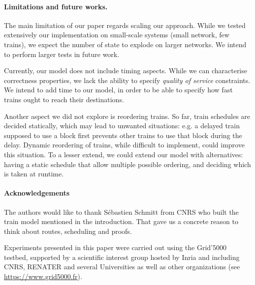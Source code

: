 \documentclass[runningheads]{llncs}
\begin{document}
\paragraph{Limitations and future works.}
The main limitation of our paper regards scaling our approach. While we tested extensively our implementation on small-scale systems (small network, few trains), we expect the number of state to explode on larger networks. We intend to perform larger tests in future work.

Currently, our model does not include timing aspects. While we can characterise correctness properties, we lack the ability to specify \emph{quality of service} constraints. We intend to add time to our model, in order to be able to specify how fast trains ought to reach their destinations.

Another aspect we did not explore is reordering trains. So far, train schedules are decided statically, which may lead to unwanted situations: e.g. a delayed train supposed to use a block first prevents other trains to use that block during the delay. Dynamic reordering of trains, while difficult to implement, could improve this situation. To a lesser extend, we could extend our model with alternatives: having a static schedule that allow multiple possible ordering, and deciding which is taken at runtime.


\paragraph{Acknowledgements} The authors would like to thank Sébastien Schmitt from CNRS who built the train model mentioned in the introduction. That gave us a concrete reason to think about routes, scheduling and proofs.

Experiments presented in this paper were carried out using the Grid'5000 testbed, supported by a scientific interest group hosted by Inria and including CNRS, RENATER and several Universities as well as other organizations (see \url{https://www.grid5000.fr}).



\end{document}

